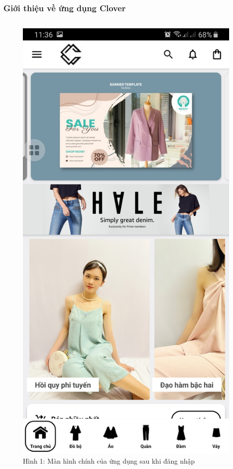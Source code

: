 \documentclass{beamer}
\begin{document}
\begin{frame}
    \frametitle{Giới thiệu về ứng dụng Clover}
    \begin{columns}
        \begin{figure}
            \centering
            \includegraphics[height=0.7\textheight]{images/01.png}
            \caption{\centering\tiny{Hình 1: Màn hình chính của ứng dụng sau khi đăng nhập}}


\end{figure}
\end{columns}
\end{frame}
\end{document}
